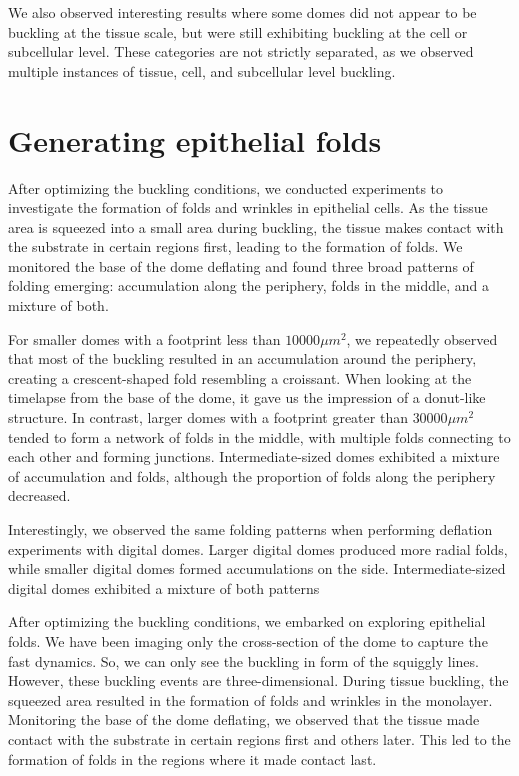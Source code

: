 We also observed interesting results where some domes did not appear to
be buckling at the tissue scale, but were still exhibiting buckling at
the cell or subcellular level. These categories are not strictly
separated, as we observed multiple instances of tissue, cell, and
subcellular level buckling.

\hypertarget{generating-epithelial-folds}{%
	\section{Generating epithelial
		folds}\label{generating-epithelial-folds}}

After optimizing the buckling conditions, we conducted experiments to
investigate the formation of folds and wrinkles in epithelial cells. As
the tissue area is squeezed into a small area during buckling, the
tissue makes contact with the substrate in certain regions first,
leading to the formation of folds. We monitored the base of the dome
deflating and found three broad patterns of folding emerging:
accumulation along the periphery, folds in the middle, and a mixture of
both.

For smaller domes with a footprint less than \(10000 \mu m^2\), we
repeatedly observed that most of the buckling resulted in an
accumulation around the periphery, creating a crescent-shaped fold
resembling a croissant. When looking at the timelapse from the base of
the dome, it gave us the impression of a donut-like structure. In
contrast, larger domes with a footprint greater than \(30000\mu m^2\)
tended to form a network of folds in the middle, with multiple folds
connecting to each other and forming junctions. Intermediate-sized domes
exhibited a mixture of accumulation and folds, although the proportion
of folds along the periphery decreased.

Interestingly, we observed the same folding patterns when performing
deflation experiments with digital domes. Larger digital domes produced
more radial folds, while smaller digital domes formed accumulations on
the side. Intermediate-sized digital domes exhibited a mixture of both
patterns

After optimizing the buckling conditions, we embarked on exploring
epithelial folds. We have been imaging only the cross-section of the
dome to capture the fast dynamics. So, we can only see the buckling in
form of the squiggly lines. However, these buckling events are
three-dimensional. During tissue buckling, the squeezed area resulted in
the formation of folds and wrinkles in the monolayer. Monitoring the
base of the dome deflating, we observed that the tissue made contact
with the substrate in certain regions first and others later. This led
to the formation of folds in the regions where it made contact last.

